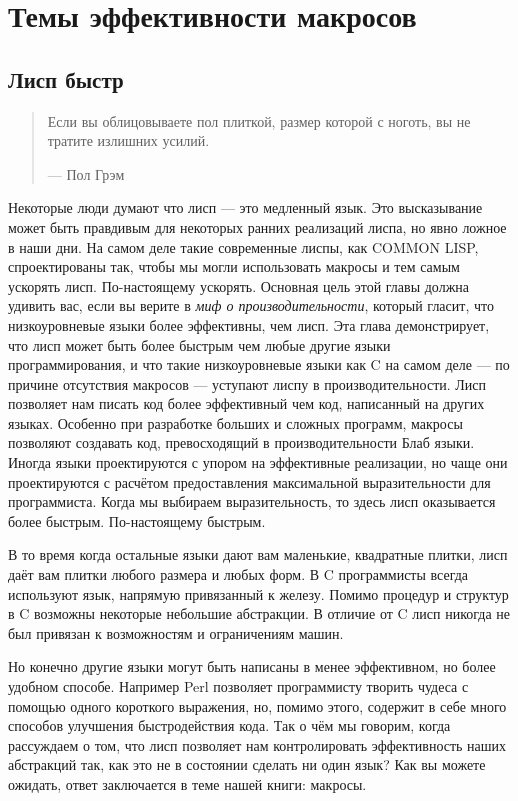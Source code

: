 \chapter{Темы эффективности макросов}\label{chapter_macro_efficiency_topics}
\section{Лисп быстр}\label{section_lisp_is_fast}
\begin{quote}
Если вы облицовываете пол плиткой, размер которой с ноготь, вы не тратите излишних усилий.

--- Пол Грэм
\end {quote}


Некоторые люди думают что лисп --- это медленный язык. Это высказывание может быть правдивым для некоторых ранних реализаций лиспа, но явно ложное в наши дни. На самом деле такие современные лиспы, как COMMON LISP, спроектированы так, чтобы мы могли использовать макросы и тем самым ускорять лисп. По-настоящему ускорять. Основная цель этой главы должна удивить вас, если вы верите в \emph{миф о производительности}, который гласит, что низкоуровневые языки более эффективны, чем лисп. Эта глава демонстрирует, что лисп может быть более быстрым чем любые другие языки программирования, и что такие низкоуровневые языки как C на самом деле --- по причине отсутствия макросов --- уступают лиспу в производительности. Лисп позволяет нам писать код более эффективный чем код, написанный на других языках. Особенно при разработке больших и сложных программ, макросы позволяют создавать код, превосходящий в производительности Блаб языки. Иногда языки проектируются с упором на эффективные реализации, но чаще они проектируются с расчётом предоставления максимальной выразительности для программиста. Когда мы выбираем выразительность, то здесь лисп оказывается более быстрым. По-настоящему быстрым. 

В то время когда остальные языки дают вам маленькие, квадратные плитки, лисп даёт вам плитки любого размера и любых форм. В C программисты всегда используют язык, напрямую привязанный к железу. Помимо процедур и структур в C возможны некоторые небольшие абстракции. В отличие от C лисп никогда не был привязан к возможностям и ограничениям машин.

Но конечно другие языки могут быть написаны в менее эффективном, но более удобном способе. Например Perl позволяет программисту творить чудеса с помощью одного короткого выражения, но, помимо этого, содержит в себе много способов улучшения быстродействия кода. Так о чём мы говорим, когда рассуждаем о том, что лисп позволяет нам контролировать эффективность наших абстракций так, как это не в состоянии сделать ни один язык? Как вы можете ожидать, ответ заключается в теме нашей книги: макросы.


